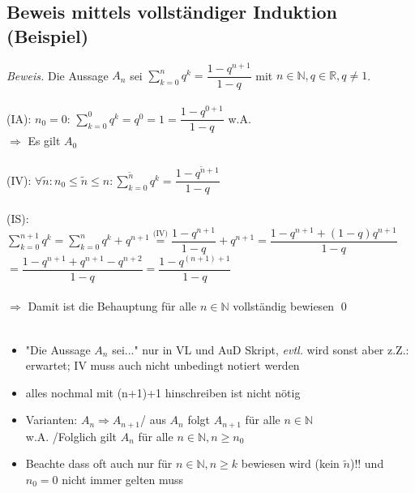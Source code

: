 \documentclass[10pt,a4paper]{article}
\begin{document}
\subsection{Beweis mittels vollständiger Induktion (Beispiel)}
\textit{Beweis.}
Die Aussage $A_{n}$ sei $\sum_{k=0}^{n} q^{k}= \dfrac{1-q^{n+1}}{1-q}$ mit $n \in \mathbb{N}, q \in \mathbb{R}, q \neq 1$.\\\\
(IA): $n_{0}=0$: $\sum_{k=0}^{0} q^{k}=q^{0}=1= \dfrac{1-q^{0+1}}{1-q}$ \hspace{0.3cm} w.A.\\
\hspace*{1cm}$\Rightarrow$ Es gilt $A_{0}$\\\\
(IV): $\forall \tilde{n}: n_{0} \leq \tilde{n} \leq n:\sum_{k=0}^{\tilde{n}} q^{k}= \dfrac{1-q^{\tilde{n}+1}}{1-q}$\\\\
(IS):$\sum_{k=0}^{n+1} q^{k}= \sum_{k=0}^{n} q^{k}+q^{n+1}\stackrel{\text{(IV)}}{=}\dfrac{1-q^{n+1}}{1-q}+q^{n+1}=\dfrac{1-q^{n+1}+(1-q)q^{n+1}}{1-q}$\\
\hspace*{2.23cm}$=\dfrac{1-q^{n+1}+q^{n+1}-q^{n+2}}{1-q}=\dfrac{1-q^{(n+1)+1}}{1-q}$\\\\
\hspace*{1cm}$\Rightarrow$ Damit ist die Behauptung für alle $n \in \mathbb{N}$ vollständig bewiesen
\qed\\\\
\begin{itemize}
\item "Die Aussage $A_{n}$ sei..." nur in VL und AuD Skript, \textit{evtl.} wird sonst aber z.Z.: erwartet; IV muss auch nicht unbedingt notiert werden
\item alles nochmal mit (n+1)+1 hinschreiben ist nicht nötig
\item Varianten: $A_{n} \Rightarrow A_{n+1}$/ aus $A_{n}$ folgt $A_{n+1}$ für alle $n\in \mathbb{N}$\\
 w.A. /Folglich gilt $A_{n}$ für alle $n \in \mathbb{N}, n \geq n_{0}$
\item Beachte dass oft auch nur für $n \in \mathbb{N}, n\geq k$ bewiesen wird (kein $\tilde{n}$)!! und $n_{0}=0$ nicht immer gelten muss
\end{itemize}
\end{document}
